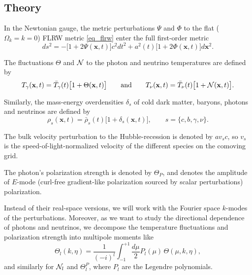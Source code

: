 \documentclass[10pt,a4paper]{article}
\begin{document}
\subsection{Theory}

In the Newtonian gauge,
the metric perturbations $\Psi$ and $\Phi$ to the flat ($\Omega_k=k=0$) FLRW metric \eqref{eq_flrw}
enter the full first-order metric
\begin{equation}
	ds^2 = -\big[1 + 2\Psi(\mathbf{x},t)\big] c^2 dt^2 + a^2(t) \big[1 + 2\Phi(\mathbf{x},t)\big] d\mathbf{x}^2 .
\label{eq_metric}
\end{equation}

The fluctuations $\Theta$ and $\mathcal{N}$ to the photon and neutrino temperatures are defined by
\begin{equation}
	T_\gamma(\mathbf{x},t) = \bar{T}_\gamma(t) \big[1+\Theta(\mathbf{x},t)\big]
	\qquad \text{and} \qquad
	T_\nu(\mathbf{x},t) = \bar{T}_\nu(t) \big[1+\mathcal{N}(\mathbf{x},t)\big].
\end{equation}

Similarly, the mass-energy overdensities $\delta_s$ of cold dark matter, baryons, photons and neutrinos are defined by
\begin{equation}
	\rho_s(\mathbf{x},t) = \bar{\rho}_s(t) \big[1+\delta_s(\mathbf{x},t)\big], \qquad s=\{c,b,\gamma,\nu\}.
\end{equation}

The bulk velocity perturbation to the Hubble-recession is denoted by $a v_s c$,
so $v_s$ is the speed-of-light-normalized velocity of the different species on the comoving grid.

The photon's polarization strength is denoted by $\Theta_P$,
and denotes the amplitude of $E$-mode (curl-free gradient-like polarization sourced by scalar perturbations) polarization.

Instead of their real-space versions,
we will work with the Fourier space $k$-modes of the perturbations.
Moreover, as we want to study the directional dependence of photons and neutrinos,
we decompose the temperature fluctuations and polarization strength into multipole moments like
\begin{equation}
	\Theta_l(k,\eta) = \frac{1}{(-i)^l} \int_{-1}^{+1} \frac{d\mu}{2} P_l(\mu) \, \Theta(\mu,k,\eta),
\end{equation}
and similarly for $\mathcal{N}_l$ and $\Theta^P_l$,
where $P_l$ are the Legendre polynomials.
\end{document}

